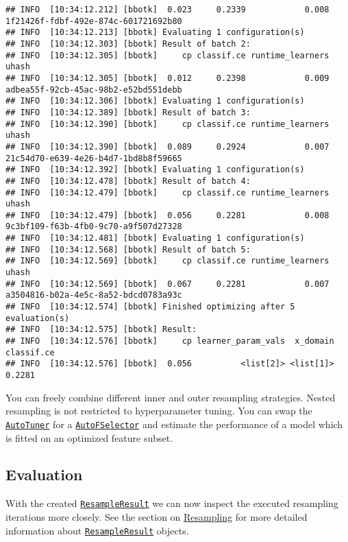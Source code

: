 \documentclass[
]{scrbook}
\begin{document}
\begin{verbatim}
## INFO  [10:34:12.212] [bbotk]  0.023     0.2339            0.008 1f21426f-fdbf-492e-874c-601721692b80 
## INFO  [10:34:12.213] [bbotk] Evaluating 1 configuration(s) 
## INFO  [10:34:12.303] [bbotk] Result of batch 2: 
## INFO  [10:34:12.305] [bbotk]     cp classif.ce runtime_learners                                uhash 
## INFO  [10:34:12.305] [bbotk]  0.012     0.2398            0.009 adbea55f-92cb-45ac-98b2-e52bd551debb 
## INFO  [10:34:12.306] [bbotk] Evaluating 1 configuration(s) 
## INFO  [10:34:12.389] [bbotk] Result of batch 3: 
## INFO  [10:34:12.390] [bbotk]     cp classif.ce runtime_learners                                uhash 
## INFO  [10:34:12.390] [bbotk]  0.089     0.2924            0.007 21c54d70-e639-4e26-b4d7-1bd8b8f59665 
## INFO  [10:34:12.392] [bbotk] Evaluating 1 configuration(s) 
## INFO  [10:34:12.478] [bbotk] Result of batch 4: 
## INFO  [10:34:12.479] [bbotk]     cp classif.ce runtime_learners                                uhash 
## INFO  [10:34:12.479] [bbotk]  0.056     0.2281            0.008 9c3bf109-f63b-4fb0-9c70-a9f507d27328 
## INFO  [10:34:12.481] [bbotk] Evaluating 1 configuration(s) 
## INFO  [10:34:12.568] [bbotk] Result of batch 5: 
## INFO  [10:34:12.569] [bbotk]     cp classif.ce runtime_learners                                uhash 
## INFO  [10:34:12.569] [bbotk]  0.067     0.2281            0.007 a3504816-b02a-4e5c-8a52-bdcd0783a93c 
## INFO  [10:34:12.574] [bbotk] Finished optimizing after 5 evaluation(s) 
## INFO  [10:34:12.575] [bbotk] Result: 
## INFO  [10:34:12.576] [bbotk]     cp learner_param_vals  x_domain classif.ce 
## INFO  [10:34:12.576] [bbotk]  0.056          <list[2]> <list[1]>     0.2281
\end{verbatim}

You can freely combine different inner and outer resampling strategies.
Nested resampling is not restricted to hyperparameter tuning.
You can swap the \href{https://mlr3tuning.mlr-org.com/reference/AutoTuner.html}{\texttt{AutoTuner}} for a \href{https://mlr3fselect.mlr-org.com/reference/AutoFSelector.html}{\texttt{AutoFSelector}} and estimate the performance of a model which is fitted on an optimized feature subset.

\hypertarget{nested-resamp-eval}{%
\subsection{Evaluation}\label{nested-resamp-eval}}

With the created \href{https://mlr3.mlr-org.com/reference/ResampleResult.html}{\texttt{ResampleResult}} we can now inspect the executed resampling iterations more closely.
See the section on \protect\hyperlink{resampling}{Resampling} for more detailed information about \href{https://mlr3.mlr-org.com/reference/ResampleResult.html}{\texttt{ResampleResult}} objects.
\end{document}
